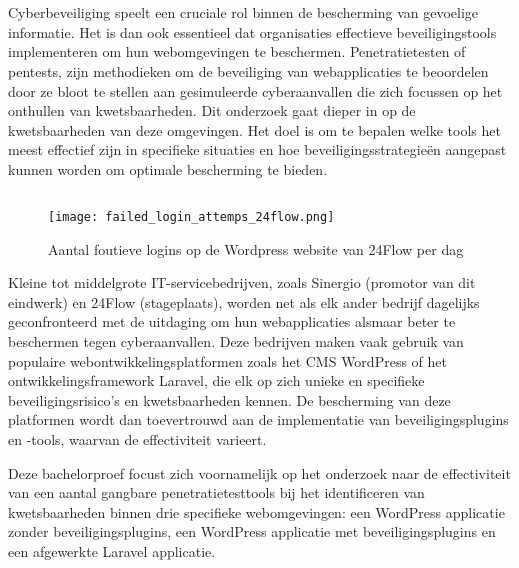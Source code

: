 
\chapter{}%
\label{ch:inleiding}
Cyberbeveiliging speelt een cruciale rol binnen de bescherming van gevoelige informatie. Het is dan ook essentieel dat organisaties 
effectieve beveiligingstools implementeren om hun webomgevingen te beschermen. Penetratietesten of pentests, zijn  
methodieken om de beveiliging van webapplicaties te beoordelen door ze bloot te stellen aan gesimuleerde 
cyberaanvallen die zich focussen op het onthullen van kwetsbaarheden. Dit onderzoek gaat dieper in op de kwetsbaarheden van deze omgevingen. Het doel is om te bepalen welke tools 
het meest effectief zijn in specifieke situaties en hoe beveiligingsstrategieën aangepast kunnen worden om optimale 
bescherming te bieden.


\section{}%
\label{sec:probleemstelling}

\begin{figure}
  \centering
  \texttt{[image: failed\_login\_attemps\_24flow.png]}
  \caption[Aantal foutieve logins op de Wordpress website van 24Flow per dag ]{Aantal foutieve logins op de Wordpress website van 24Flow per dag }
\end{figure}
Kleine tot middelgrote IT-servicebedrijven, zoals Sinergio (promotor van dit eindwerk) en 24Flow (stageplaats), worden net 
als elk ander bedrijf dagelijks geconfronteerd met de uitdaging om hun 
webapplicaties alsmaar beter te beschermen tegen cyberaanvallen. Deze bedrijven maken vaak gebruik van populaire webontwikkelingsplatformen 
zoals het CMS WordPress of het ontwikkelingsframework Laravel, die elk op zich unieke en specifieke beveiligingsrisico's en 
kwetsbaarheden kennen. De bescherming van deze platformen wordt dan toevertrouwd aan de implementatie van beveiligingsplugins 
en -tools, waarvan de effectiviteit varieert.

Deze bachelorproef focust zich voornamelijk op het onderzoek naar de effectiviteit van een aantal gangbare penetratietesttools  
bij het identificeren van kwetsbaarheden binnen drie specifieke webomgevingen: een WordPress applicatie zonder beveiligingsplugins,
een WordPress applicatie met beveiligingsplugins en een afgewerkte Laravel applicatie. 

